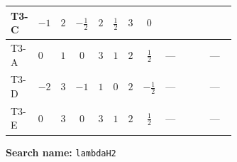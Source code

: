 \documentclass[8pt]{article}
\begin{document}
\begin{landscape}
\begin{longtable}{@{}llcccccc >{\raggedright\arraybackslash}p{0.21\linewidth} >{\raggedright\arraybackslash}p{0.21\linewidth} >{\raggedright\arraybackslash}p{0.21\linewidth}@{}}
\midrule
T3-C & $-1$ & $2$ & $-\frac{1}{2}$ & $2$ & $\frac{1}{2}$ & $3$ & $0$ & \scriptsize\adjustbox{max width=\linewidth}{$\begin{gathered} +24 {\lambda_{H^\dagger H^\dagger S_2 S_2}} \left({\lambda_{H^\dagger H^\dagger S_2 S_2}}\right)^{*}\end{gathered}$} & \scriptsize\adjustbox{max width=\linewidth}{$\begin{gathered} +6 {\lambda_{T3}} \left({\lambda_{T3}}\right)^{*}\end{gathered}$} & \scriptsize\adjustbox{max width=\linewidth}{$\begin{gathered} +\frac{9 {g_2}^4}{4}\end{gathered}$} \\
\midrule
T3-A & $0$ & $1$ & $0$ & $3$ & $1$ & $2$ & $\frac{1}{2}$ & --- & \scriptsize\adjustbox{max width=\linewidth}{$\begin{gathered} +4 {\lambda_{T3}} \left({\lambda_{T3}}\right)^{*}\end{gathered}$} & --- \\
\midrule
T3-D & $-2$ & $3$ & $-1$ & $1$ & $0$ & $2$ & $-\frac{1}{2}$ & --- & \scriptsize\adjustbox{max width=\linewidth}{$\begin{gathered} +12 {\lambda_{T3}} \left({\lambda_{T3}}\right)^{*}\end{gathered}$} & --- \\
\midrule
T3-E & $0$ & $3$ & $0$ & $3$ & $1$ & $2$ & $\frac{1}{2}$ & --- & \scriptsize\adjustbox{max width=\linewidth}{$\begin{gathered} +4 {\lambda_{T3}} \left({\lambda_{T3}}\right)^{*}\end{gathered}$} & --- \\
\midrule
\bottomrule
\end{longtable}
\clearpage
\noindent\textbf{Search name: }\texttt{lambdaH2}\par\smallskip

\end{landscape}
\end{document}
